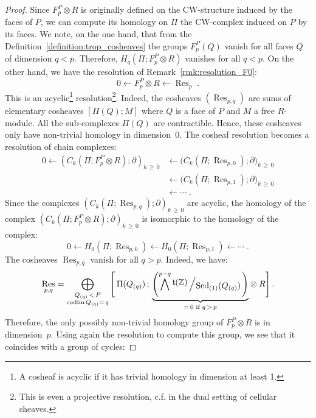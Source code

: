 \documentclass[AHL,Unicode,longabstracts,published]{cedram}
\newcommand{\bigslant}[2]{{\raisebox{.2em}{$#1$}\left/\raisebox{-.2em}{$#2$}\right.}}
\newcommand{\Z}{\mathbb{Z}}
\renewcommand{\t}{\mathfrak{t}}
\DeclareMathOperator{\Sed}{Sed}
\DeclareMathOperator{\codim}{codim}
\DeclareMathOperator{\Res}{Res}
\begin{document}
\begin{proof}
Since $F^{P}_p\otimes R$ is originally defined on the CW-structure induced by the faces of $P$, we can compute its homology on $\Pi$ the CW-complex induced on $P$ by its faces. We note, on the one hand, that from the Definition~\ref{definition:trop_cosheaves} the groups $F^{P}_p(Q)$ vanish for all faces $Q$ of dimension $q<p$. Therefore, $H_q(\Pi;F^{P}_p\otimes R)$ vanishes for all $q<p$. On the other hand, we have the resolution of Remark~\ref{rmk:resolution_F0}:
\begin{equation*}
0\leftarrow F^{P}_p\otimes R \leftarrow \Res_p\;.
\end{equation*}
This is an acyclic\footnote{A cosheaf is acyclic if it has trivial homology in dimension at least 1.} resolution\footnote{This is even a projective resolution, c.f. \cite{She_cel_des} in the dual setting of cellular sheaves.}. Indeed, the cosheaves $(\Res_{p,q})$ are sums of elementary cosheaves $[\Pi(Q);M]$ where $Q$ is a face of $P$ and $M$ a free $R$-module. All the sub-complexes $\Pi(Q)$ are contractible. Hence, these cosheaves only have non-trivial homology in dimension~$0$. The cosheaf resolution becomes a resolution of chain complexes:
\begin{align*}
0\leftarrow \left(C_k(\Pi;F^{P}_p\otimes R);\partial\right)_{k\,\geq\,0} &\leftarrow \big(C_k(\Pi;\Res_{p,0});\partial\big)_{k\,\geq\,0}\\
&\leftarrow \big(C_k(\Pi;\Res_{p,1});\partial\big)_{k\,\geq\,0}\\
&\leftarrow \cdots \;.
\end{align*}
Since the complexes $(C_k(\Pi;\Res_{p,q});\partial)_{k\,\geq\,0}$ are acyclic, the homology of the complex ${(C_k(\Pi;F^{P}_p\otimes R);\partial)_{k\,\geq\,0}}$ is isomorphic to the homology of the complex:
\begin{equation*}
0 \leftarrow H_0 \left(\Pi;\Res_{p,0}\right)\leftarrow H_0\left(\Pi;\Res_{p,1}\right)\leftarrow \cdots \;.
\end{equation*}
The cosheaves $\Res_{p,q}$ vanish for all $q>p$. Indeed, we have:
\begin{equation*}
\Res_{p,q}=\bigoplus_{\substack{Q_{(q)}\,<\,P \\ 
\codim Q_{(q)} =\,q}} \Bigg[\, \Pi(Q_{(q)})\,;\, \underset{=\,0 \text{ if }q\,>\,p}{\underbrace{\left(\bigwedge^{p-q}\bigslant{\t(\Z)}{\Sed_{(1)}(Q_{(q)})}\right)}}\otimes R \Bigg]\,.
\end{equation*}
Therefore, the only possibly non-trivial homology group of $F^{P}_p\otimes R$ is in dimension~$p$. Using again the resolution to compute this group, we see that it coincides with a group of cycles:

\end{proof}
\end{document}
